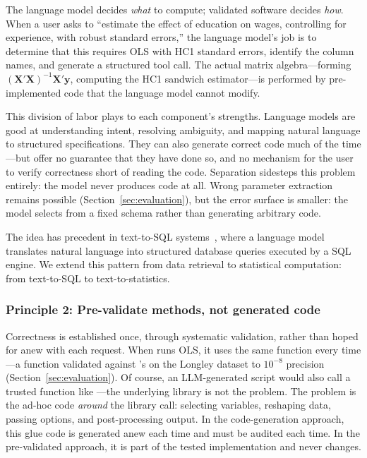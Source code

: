 The language model decides \emph{what} to compute; validated software
decides \emph{how}. When a user asks to ``estimate the effect of
education on wages, controlling for experience, with robust standard
errors,'' the language model's job is to determine that this requires
OLS with HC1 standard errors, identify the column names, and generate
a structured tool call. The actual matrix algebra---forming
$(\bm{X}'\bm{X})^{-1}\bm{X}'\bm{y}$, computing the
HC1 sandwich estimator---is performed by pre-implemented code that
the language model cannot modify.

This division of labor plays to each component's strengths. Language
models are good at understanding intent, resolving ambiguity, and
mapping natural language to structured specifications. They can also
generate correct code much of the time---but offer no guarantee that
they have done so, and no mechanism for the user to verify correctness
short of reading the code. Separation sidesteps this problem entirely:
the model never produces code at all.
Wrong parameter extraction remains possible (Section~\ref{sec:evaluation}),
but the error surface is smaller: the model selects from a fixed schema
rather than generating arbitrary code.

The idea has precedent in text-to-SQL systems~\citep{Yu+etal:2018,
Li+etal:2024}, where a language model translates natural language into
structured database queries executed by a SQL engine. We extend this
pattern from data retrieval to statistical computation: from
text-to-SQL to text-to-statistics.

\subsubsection{Principle 2: Pre-validate methods, not generated code}

Correctness is established once, through systematic validation,
rather than hoped for anew with each request. When
 runs OLS, it uses the same 
function every time---a function validated against 's
 on the Longley dataset to $10^{-8}$ precision
(Section~\ref{sec:evaluation}). Of course, an LLM-generated script
would also call a trusted function like ---the underlying
library is not the problem. The problem is the ad-hoc code
\emph{around} the library call: selecting variables, reshaping data,
passing options, and post-processing output. In the code-generation
approach, this glue code is generated anew each time and must be
audited each time. In the pre-validated approach, it is part of the
tested implementation and never changes.

